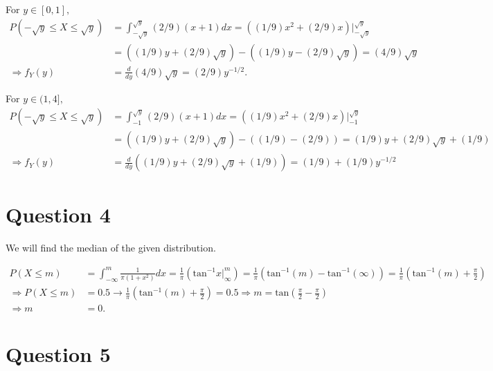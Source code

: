 \documentclass[11pt]{article} %
\begin{document}
For $y \in [0,1],$
\begin{align*}
P(-\sqrt{y}\leq X \leq \sqrt{y}) &= \int_{-\sqrt{y}}^{\sqrt{y}} (2/9) (x+1) dx = ((1/9)x^2  + (2/9)x)|_{-\sqrt{y}}^{\sqrt{y}}\\
 &= ((1/9)y + (2/9)\sqrt{y}) -((1/9)y - (2/9)\sqrt{y}) = (4/9) \sqrt{y} \\
\Rightarrow f_Y(y) &= \frac{d}{dy} (4/9)\sqrt{y} = (2/9)y^{-1/2}.
\end{align*}

For $y \in (1,4],$
\begin{align*}
P(-\sqrt{y}\leq X \leq \sqrt{y}) &= \int_{-1}^{\sqrt{y}} (2/9) (x+1) dx = ((1/9)x^2  + (2/9)x)|_{-1}^{\sqrt{y}}\\
 &= ((1/9)y + (2/9)\sqrt{y}) -((1/9) - (2/9)) = (1/9)y + (2/9)\sqrt{y} + (1/9) \\
\Rightarrow f_Y(y) &= \frac{d}{dy} \left((1/9)y + (2/9)\sqrt{y} + (1/9)\right)  = (1/9) +(1/9)y^{-1/2}
\end{align*}

\section{Question 4}
We will find the median of the given distribution.

\begin{align*}
P(X\leq m) &= \int_{-\infty}^m \frac{1}{\pi (1+x^2)} dx = \frac{1}{\pi}(\text{tan}^{-1} x |_{\infty}^{m}) =  \frac{1}{\pi}\left(\text{tan}^{-1}(m) -  \text{tan}^{-1}(\infty)\right) = \frac{1}{\pi}\left(\text{tan}^{-1}(m) + \frac{\pi}{2}\right) \\
\Rightarrow P(X \leq m) &= 0.5 \rightarrow \frac{1}{\pi}\left( \text{tan}^{-1}(m) + \frac{\pi}{2}\right) = 0.5 \Rightarrow m = \text{tan}\left(\frac{\pi}{2} - \frac{\pi}{2}\right)\\
\Rightarrow m &= 0.
\end{align*}

\section{Question 5}
%
\end{document}
